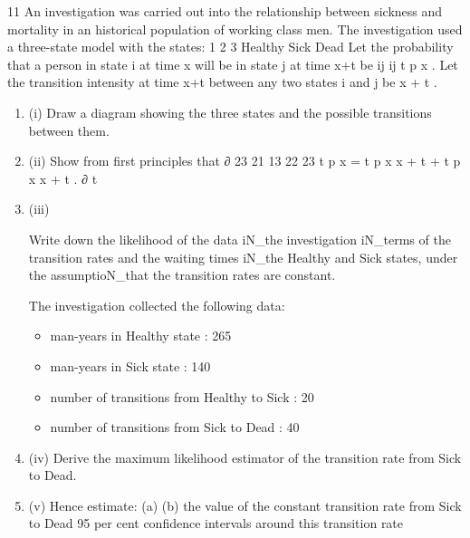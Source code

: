 \documentclass[a4paper,12pt]{article}
\begin{document}
\begin{enumerate}
11
An investigation was carried out into the relationship between sickness and mortality
in an historical population of working class men. The investigation used a three-state
model with the states:
1
2
3
Healthy
Sick
Dead
Let the probability that a person in state i at time x will be in state j at time x+t be
ij
ij
t p x . Let the transition intensity at time x+t between any two states i and j be \mu x + t .
\begin{enumerate}
\item (i) Draw a diagram showing the three states and the possible transitions between
them.

\item (ii) Show from first principles that
∂
23
21 13
22 23
t p x = t p x \mu x + t + t p x \mu x + t .
∂ t
\item (iii)

Write down the likelihood of the data iN_the investigation iN_terms of the
transition rates and the waiting times iN_the Healthy and Sick states, under the
assumptioN_that the transition rates are constant.

The investigation collected the following data:
\begin{itemize}
\item man-years in Healthy state : 265
\item man-years in Sick state : 140
\item number of transitions from Healthy to Sick : 20
\item number of transitions from Sick to Dead : 40
\end{itemize}


\item (iv) Derive the maximum likelihood estimator of the transition rate from Sick to
Dead.

\item (v) Hence estimate:
(a)
(b)
the value of the constant transition rate from Sick to Dead
95 per cent confidence intervals around this transition rate
\end{enumerate}



\end{enumerate}
\end{document}
